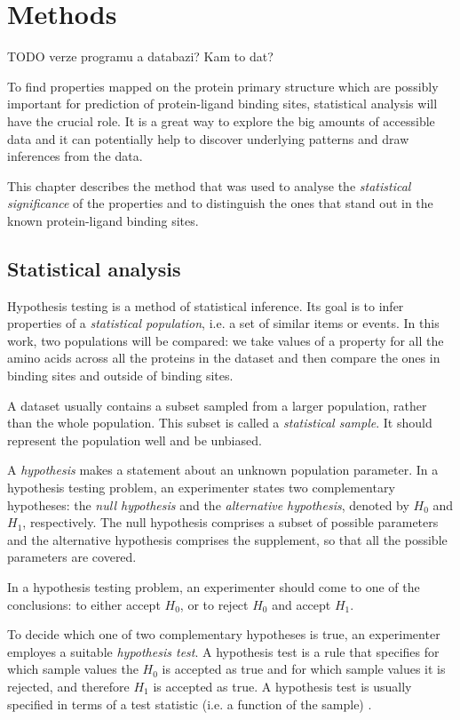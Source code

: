 
\chapter{Methods}

TODO verze programu a databazi? Kam to dat?


To find properties mapped on the protein primary structure which are possibly important for prediction of protein-ligand binding sites, statistical analysis will have the crucial role. It is a great way to explore the big amounts of accessible data and it can potentially help to discover underlying patterns and draw inferences from the data.

This chapter describes the method that was used to analyse the \textit{statistical significance} of the properties and to distinguish the ones that stand out in the known protein-ligand binding sites.

\section{Statistical analysis}

Hypothesis testing is a method of statistical inference. Its goal is to infer properties of a \textit{statistical population}, i.e. a set of similar items or events. In this work, two populations will be compared: we take values of a property for all the amino acids across all the proteins in the dataset and then compare the ones in binding sites and outside of binding sites.

A dataset usually contains a subset sampled from a larger population, rather than the whole population. This subset is called a \textit{statistical sample}. It should represent the population well and be unbiased.

A \textit{hypothesis} makes a statement about an unknown population parameter. In a hypothesis testing problem, an experimenter states two complementary hypotheses: the \textit{null hypothesis} and the \textit{alternative hypothesis}, denoted by $H_{0}$ and $H_{1}$, respectively. The null hypothesis comprises a subset of possible parameters and the alternative hypothesis comprises the supplement, so that all the possible parameters are covered.

In a hypothesis testing problem, an experimenter should come to one of the conclusions: to either accept $H_{0}$, or to reject $H_{0}$ and accept $H_{1}$.

To decide which one of two complementary hypotheses is true, an experimenter employes a suitable \textit{hypothesis test}. A hypothesis test is a rule that specifies for which sample values the $H_{0}$ is accepted as true and for which sample values it is rejected, and therefore $H_{1}$ is accepted as true. A hypothesis test is usually specified in terms of a test statistic (i.e. a function of the sample) \cite{casella}.

